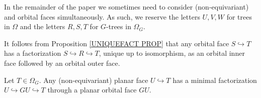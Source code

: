 \documentclass[a4paper,10pt,draft]{article}%
\begin{document}
\begin{notation}\label{TREEDIFNOT NOT}
	In the remainder of the paper we sometimes need to consider (non-equivariant) and orbital faces simultaneously.
	As such, we reserve the letters $U,V,W$ for trees in $\Omega$
	and the letters $R,S,T$ for $G$-trees in $\Omega_G$.
\end{notation}


\begin{remark}\label{INNOUTORB REM}
	It follows from Proposition \ref{UNIQUEFACT PROP} that any orbital face $S \hookrightarrow T$ has a factorization
	$S \hookrightarrow R \hookrightarrow T$, unique up to isomorphism, as an orbital inner face followed by an orbital outer face.	
\end{remark}


\begin{proposition}
	Let $T \in \Omega_G$.
	Any (non-equivariant) planar face $U \hookrightarrow T$ has a minimal factorization
	$U \hookrightarrow GU \hookrightarrow T$
	through a planar orbital face $GU$.
\end{proposition}
\end{document}
